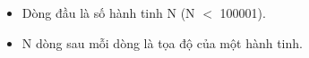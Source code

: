 \begin{itemize}
	\item     Dòng đầu là số hành tinh N (N $<$ 100001).   
	\item     N dòng sau mỗi dòng là tọa độ của một hành tinh.   
\end{itemize}

\